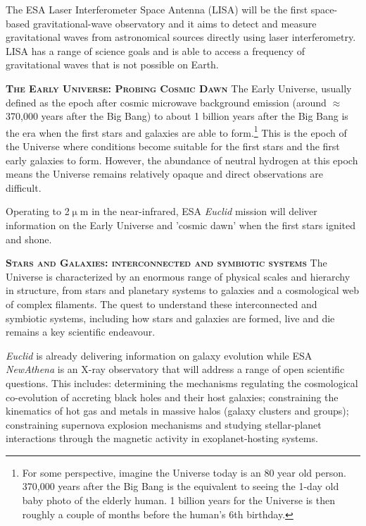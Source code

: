 \documentclass[a4paper,12pt]{article}
\begin{document}
\smallskip 
The ESA Laser Interferometer Space Antenna (LISA) will be the first
space-based gravitational-wave observatory and it aims to detect and
measure gravitational waves from astronomical sources directly using
laser interferometry. LISA has a range of science goals and is able to
access a frequency of gravitational waves that is not possible on
Earth.


\smallskip
\smallskip
\noindent
{\bfseries \textsc{\textcolor{Cerulean}{The Early Universe: Probing Cosmic Dawn}}}
The Early Universe, usually defined as the epoch after cosmic
microwave background emission (around $\approx$370,000 years after the
Big Bang) to about 1 billion years after the Big Bang is the era when
the first stars and galaxies are able to form.\footnote{For some
perspective, imagine the Universe today is an 80 year old
person. 370,000 years after the Big Bang is the equivalent to seeing
the 1-day old baby photo of the elderly human. 1 billion years for the
Universe is then roughly a couple of months before the human's 6th
birthday.}  This is the epoch of the Universe where conditions become
suitable for the first stars and the first early galaxies to form.
However, the abundance of neutral hydrogen at this epoch means the
Universe remains relatively opaque and direct observations are
difficult.

\smallskip
\smallskip
Operating to 2$\upmu$m in the near-infrared, ESA \textit{Euclid}
mission will deliver information on the Early Universe and 'cosmic
dawn' when the first stars ignited and shone.


\smallskip
\smallskip
\noindent
{\bfseries \textsc{\textcolor{Cerulean}{Stars and Galaxies: interconnected and symbiotic systems}}}
The Universe is characterized by an enormous range of physical scales and hierarchy in structure, from
stars and planetary systems to galaxies and a cosmological web of complex filaments.
The quest to understand these interconnected and symbiotic systems, including
how stars and galaxies are formed, live and die remains a key scientific endeavour. 

\smallskip
\textit{Euclid} is already delivering information on galaxy evolution
while ESA \textit{NewAthena} is an X-ray observatory that will address
a range of open scientific questions.  This includes: determining the
mechanisms regulating the cosmological co-evolution of accreting black
holes and their host galaxies; constraining the kinematics of hot gas
and metals in massive halos (galaxy clusters and groups); constraining
supernova explosion mechanisms and studying stellar-planet
interactions through the magnetic activity in exoplanet-hosting
systems.
\end{document}
